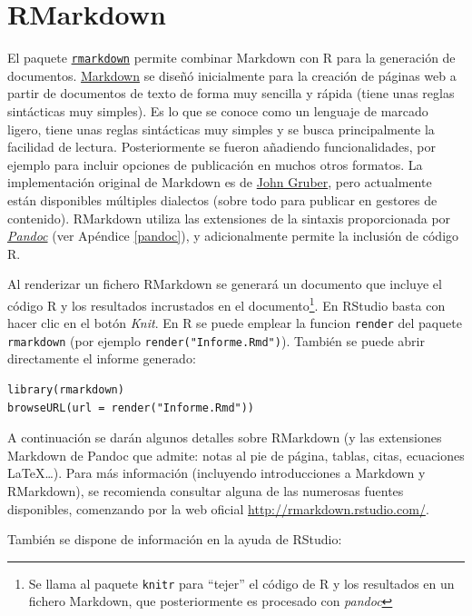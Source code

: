\documentclass[
]{book}
\theoremstyle{break}
\theoremstyle{nonumberplain}
\let\oldfootnote\footnote
\renewcommand\footnote[1]{\oldfootnote{\hspace{2mm}#1}}
\begin{document}
\section{RMarkdown}\label{rmarkdown}

El paquete \href{https://github.com/rstudio/rmarkdown}{\texttt{rmarkdown}} permite combinar Markdown con R para la generación de documentos. \href{http://daringfireball.net/projects/markdown/}{Markdown} se diseñó inicialmente para la creación de páginas web a partir de documentos de texto de forma muy sencilla y rápida (tiene unas reglas sintácticas muy simples).
Es lo que se conoce como un lenguaje de marcado ligero, tiene unas reglas sintácticas muy simples y se busca principalmente la facilidad de lectura.
Posteriormente se fueron añadiendo funcionalidades, por ejemplo para incluir opciones de publicación en muchos otros formatos.
La implementación original de Markdown es de \href{http://daringfireball.net/projects/markdown/}{John Gruber},
pero actualmente están disponibles múltiples dialectos (sobre todo para publicar en gestores de contenido).
RMarkdown utiliza las extensiones de la sintaxis proporcionada por \emph{\href{https://pandoc.org}{Pandoc}} (ver Apéndice \ref{pandoc}), y adicionalmente permite la inclusión de código R.

Al renderizar un fichero RMarkdown se generará un documento que incluye el código R y los resultados incrustados en el documento\footnote{Se llama al paquete \texttt{knitr} para ``tejer'' el código de R y los resultados en un fichero Markdown, que posteriormente es procesado con \emph{pandoc}}.
En RStudio basta con hacer clic en el botón \emph{Knit}.
En R se puede emplear la funcion \texttt{render} del paquete \texttt{rmarkdown} (por ejemplo \texttt{render("Informe.Rmd")}).
También se puede abrir directamente el informe generado:

\begin{verbatim}
library(rmarkdown)
browseURL(url = render("Informe.Rmd"))
\end{verbatim}

A continuación se darán algunos detalles sobre RMarkdown (y las extensiones Markdown de Pandoc que admite: notas al pie de página, tablas, citas, ecuaciones LaTeX\ldots).
Para más información (incluyendo introducciones a Markdown y RMarkdown), se recomienda consultar alguna de las numerosas fuentes disponibles, comenzando por la web oficial \url{http://rmarkdown.rstudio.com/}.

También se dispone de información en la ayuda de RStudio:
\end{document}
